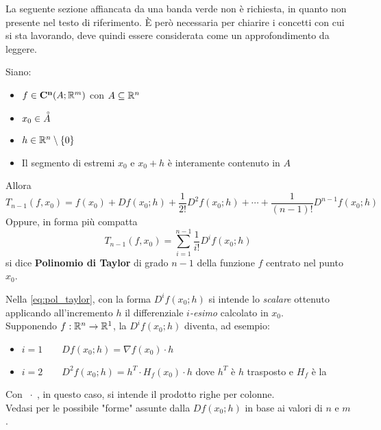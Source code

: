 \vspace*{\baselineskip}
\cbstart
La seguente sezione affiancata da una banda verde non è richiesta, in quanto non presente nel testo di riferimento. È però necessaria per chiarire i concetti con cui si sta lavorando, deve quindi essere considerata come un approfondimento da leggere.
\begin{definition}
	\label{def:pol_taylor}
	Siano:
	\begin{itemize}[noitemsep]
		\item $f \in \mathbf{C^{n}}(A;\mathbb{R}^m)$ con $A \subseteq \mathbb{R}^n$
		\item $x_0 \in \accentset{\circ}{A}$
		\item $h \in \mathbb{R}^n \setminus \left\{0\right\}$
		\item Il segmento di estremi $x_0$ e $x_0 + h$ è interamente contenuto in $A$
	\end{itemize}
	Allora
	\[T_{n-1}(f, x_0) = f(x_0) + Df(x_0; h) + \frac{1}{2!} D^2f(x_0; h) + \cdots + \frac{1}{(n-1)!} D^{n-1}f(x_0; h)\]
	Oppure, in forma più compatta
	\begin{equation}
		\label{eq:pol_taylor}
			T_{n-1}(f, x_0) = \sum\limits_{i = 1}^{n-1} \frac{1}{i!} D^if(x_0; h)
	\end{equation}
	si dice \textbf{Polinomio di Taylor} di grado $n-1$ della funzione $f$ centrato nel punto $x_0$.

	\begin{samepage}
		\begin{note}
			Nella \cref{eq:pol_taylor}, con la forma $D^if(x_0; h)$ si intende lo \textit{scalare} ottenuto applicando all’incremento $h$ il differenziale $i$\textit{-esimo} calcolato in $x_0$.\\
			Supponendo $f: \mathbb{R}^n \to \mathbb{R}^1$, la $D^if(x_0; h)$ diventa, ad esempio:
			\begin{itemize}
				\item $i = 1 \qquad Df(x_0; h) = \nabla f(x_0) \cdot h$
				\item $i = 2 \qquad D^2f(x_0; h) = h^T \cdot H_f(x_0) \cdot h$ \quad dove $h^T$ è $h$ trasposto e $H_f$ è la 
			\end{itemize}
			Con $\; \cdot \;$, in questo caso, si intende il prodotto righe per colonne.\\
			Vedasi  per le possibile "forme" assunte dalla $Df(x_0; h)$ in base ai valori di $n$ e $m$.
		\end{note}
	\end{samepage}
\end{definition}
